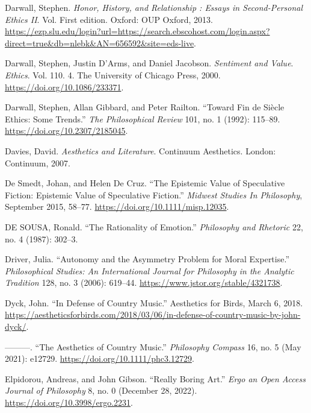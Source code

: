 \documentclass[phdthesis,12pt,final]{wuthesis}
\newlength{\cslhangindent}
\newenvironment{CSLReferences}[2] %
{\begin{list}{}{%
	\setlength{\itemindent}{0pt}
	\setlength{\leftmargin}{0pt}
	\setlength{\parsep}{0pt}
	\ifodd #1
	\setlength{\leftmargin}{\cslhangindent}
	\setlength{\itemindent}{-1\cslhangindent}
	\fi
	\setlength{\itemsep}{#2\baselineskip}}}
{\end{list}}
\theoremstyle{definition}
\theoremstyle{definition}
\theoremstyle{definition}
\theoremstyle{definition}
\theoremstyle{remark}
\begin{document}
\begin{CSLReferences}{1}{0}
Darwall, Stephen. \emph{Honor, {History}, and {Relationship} : {Essays} in {Second-Personal Ethics II}}. Vol. First edition. Oxford: OUP Oxford, 2013. \url{https://ezp.slu.edu/login?url=https://search.ebscohost.com/login.aspx?direct=true&db=nlebk&AN=656592&site=eds-live}.

Darwall, Stephen, Justin D'Arms, and Daniel Jacobson. \emph{Sentiment and {Value}}. \emph{Ethics}. Vol. 110. 4. The University of Chicago Press, 2000. \url{https://doi.org/10.1086/233371}.

Darwall, Stephen, Allan Gibbard, and Peter Railton. {``Toward Fin de Siècle Ethics: Some Trends.''} \emph{The Philosophical Review} 101, no. 1 (1992): 115--89. \url{https://doi.org/10.2307/2185045}.

Davies, David. \emph{Aesthetics and Literature}. Continuum Aesthetics. London: Continuum, 2007.

De Smedt, Johan, and Helen De Cruz. {``The Epistemic Value of Speculative Fiction: Epistemic Value of Speculative Fiction.''} \emph{Midwest Studies In Philosophy}, September 2015, 58--77. \url{https://doi.org/10.1111/misp.12035}.

DE SOUSA, Ronald. {``The {Rationality} of {Emotion}.''} \emph{Philosophy and Rhetoric} 22, no. 4 (1987): 302--3.

Driver, Julia. {``Autonomy and the {Asymmetry Problem} for {Moral Expertise}.''} \emph{Philosophical Studies: An International Journal for Philosophy in the Analytic Tradition} 128, no. 3 (2006): 619--44. \url{https://www.jstor.org/stable/4321738}.

Dyck, John. {``In Defense of Country Music.''} Aesthetics for Birds, March 6, 2018. \url{https://aestheticsforbirds.com/2018/03/06/in-defense-of-country-music-by-john-dyck/}.

---------. {``The Aesthetics of Country Music.''} \emph{Philosophy Compass} 16, no. 5 (May 2021): e12729. \url{https://doi.org/10.1111/phc3.12729}.

Elpidorou, Andreas, and John Gibson. {``Really {Boring Art}.''} \emph{Ergo an Open Access Journal of Philosophy} 8, no. 0 (December 28, 2022). \url{https://doi.org/10.3998/ergo.2231}.


\end{CSLReferences}
\end{document}
